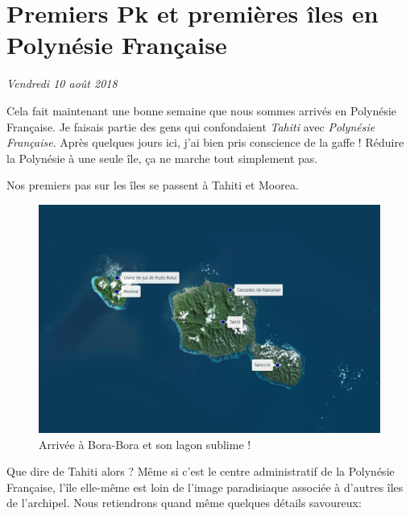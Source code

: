 \hypertarget{premiers-pk-et-premiuxe8res-uxeeles-en-polynuxe9sie-franuxe7aise}{%
\section{Premiers Pk et premières îles en Polynésie
Française}\label{premiers-pk-et-premiuxe8res-uxeeles-en-polynuxe9sie-franuxe7aise}}

\emph{Vendredi 10 août 2018}

Cela fait maintenant une bonne semaine que nous sommes arrivés en
Polynésie Française. Je faisais partie des gens qui confondaient
\emph{Tahiti} avec \emph{Polynésie Française}. Après quelques jours ici,
j'ai bien pris conscience de la gaffe ! Réduire la Polynésie à une seule
île, ça ne marche tout simplement pas.

Nos premiers pas sur les îles se passent à Tahiti et Moorea.

\begin{figure}
\centering
\includegraphics{maps/Polynesie1_1.png}
\caption{Arrivée à Bora-Bora et son lagon sublime !}
\end{figure}

Que dire de Tahiti alors ? Même si c'est le centre administratif de la
Polynésie Française, l'île elle-même est loin de l'image paradisiaque
associée à d'autres îles de l'archipel. Nous retiendrons quand même
quelques détails savoureux:

